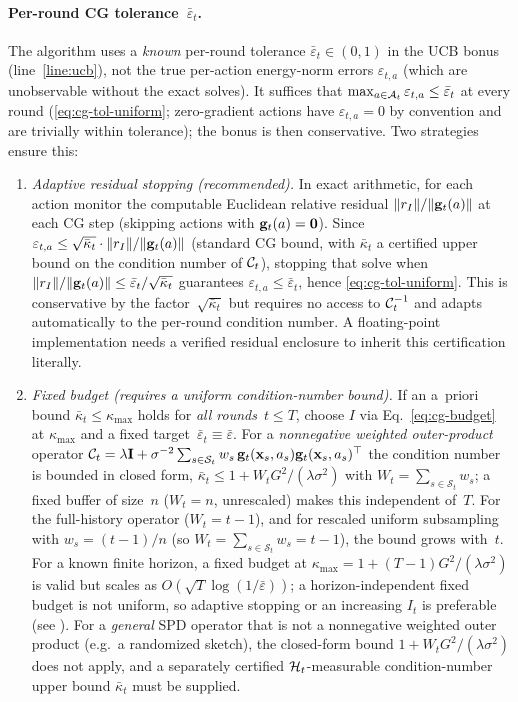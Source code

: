 \paragraph{Per-round CG tolerance~$\bar\varepsilon_t$.}
The algorithm uses a \emph{known} per-round tolerance
$\bar\varepsilon_t\in(0,1)$ in the UCB bonus (line~\ref{line:ucb}), not the
true per-action energy-norm errors $\varepsilon_{t,a}$ (which are unobservable
without the exact solves).  It suffices that
$\max_{a\in\mathcal{A}_t}\varepsilon_{t,a}\le\bar\varepsilon_t$ at every round
(\eqref{eq:cg-tol-uniform}; zero-gradient actions have $\varepsilon_{t,a}=0$ by
convention and are trivially within tolerance); the bonus is then conservative.
Two strategies ensure this:
\begin{enumerate}[nosep,leftmargin=1.5em]
\item \emph{Adaptive residual stopping (recommended).}
  In exact arithmetic, for each action monitor the computable Euclidean relative residual
  $\|r_I\|/\|\mathbf{g}_t(a)\|$ at each CG step (skipping actions with
  $\mathbf{g}_t(a)=\mathbf0$).  Since
  $\varepsilon_{t,a} \le \sqrt{\bar\kappa_t}\cdot\|r_I\|/\|\mathbf{g}_t(a)\|$
  (standard CG bound, with $\bar\kappa_t$ a certified upper bound on the
  condition number of $\mathcal{C}_t$), stopping that solve when
  $\|r_I\|/\|\mathbf{g}_t(a)\| \le \bar\varepsilon_t/\sqrt{\bar\kappa_t}$
  guarantees $\varepsilon_{t,a} \le \bar\varepsilon_t$, hence
  \eqref{eq:cg-tol-uniform}.
  This is conservative by the factor~$\sqrt{\bar\kappa_t}$ but requires
  no access to $\mathcal{C}_t^{-1}$ and adapts automatically to the
  per-round condition number.  A floating-point implementation needs a
  verified residual enclosure to inherit this certification literally.
\item \emph{Fixed budget (requires a uniform condition-number bound).}
  If an a~priori bound
  $\bar\kappa_t \le \kappa_{\max}$ holds for \emph{all rounds}~$t\le T$,
  choose $I$ via Eq.~\eqref{eq:cg-budget} at $\kappa_{\max}$ and a fixed
  target~$\bar\varepsilon_t\equiv\bar\varepsilon$.
  For a \emph{nonnegative weighted outer-product} operator
  $\mathcal{C}_t=\lambda\mathbf{I}+\sigma^{-2}\sum_{s\in\mathcal{S}_t}w_s\,
  \mathbf{g}_t(\mathbf{x}_s,a_s)\mathbf{g}_t(\mathbf{x}_s,a_s)^\top$ the condition number is bounded in
  closed form, $\bar\kappa_t\le 1+W_tG^2/(\lambda\sigma^2)$ with
  $W_t=\sum_{s\in\mathcal{S}_t}w_s$; a fixed buffer of size~$n$ ($W_t=n$,
  unrescaled) makes this independent of~$T$.
  For the full-history operator ($W_t=t{-}1$), and for rescaled uniform
  subsampling with $w_s=(t{-}1)/n$ (so $W_t=\sum_{s\in\mathcal{S}_t}w_s=t{-}1$),
  the bound grows with~$t$.  For a known finite horizon, a fixed budget at
  $\kappa_{\max}=1+(T-1)G^2/(\lambda\sigma^2)$ is valid but scales as
  $O(\sqrt T\log(1/\bar\varepsilon))$; a horizon-independent fixed budget is
  not uniform, so adaptive stopping or an increasing $I_t$ is preferable
  (see ).
  For a \emph{general} SPD operator that is not a nonnegative weighted outer
  product (e.g.\ a randomized sketch), the closed-form bound
  $1+W_tG^2/(\lambda\sigma^2)$ does not apply, and a separately certified
  $\mathcal{H}_t$-measurable condition-number upper bound $\bar\kappa_t$ must be
  supplied.
\end{enumerate}
